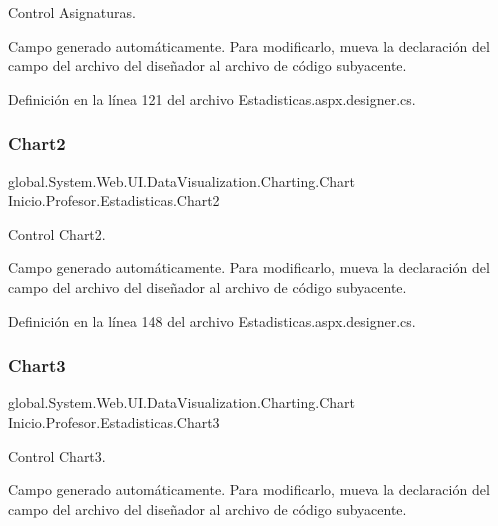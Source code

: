 Control Asignaturas. 

Campo generado automáticamente. Para modificarlo, mueva la declaración del campo del archivo del diseñador al archivo de código subyacente. 

Definición en la línea 121 del archivo Estadisticas.\+aspx.\+designer.\+cs.

\mbox{\label{classInicio_1_1Profesor_1_1Estadisticas_a78faa17a7b2d5bb5d7d92a48869af0bf}} 
\subsubsection{\texorpdfstring{Chart2}{Chart2}}
{\footnotesize\ttfamily global.\+System.\+Web.\+U\+I.\+Data\+Visualization.\+Charting.\+Chart Inicio.\+Profesor.\+Estadisticas.\+Chart2\hspace{0.3cm}{\ttfamily [protected]}}



Control Chart2. 

Campo generado automáticamente. Para modificarlo, mueva la declaración del campo del archivo del diseñador al archivo de código subyacente. 

Definición en la línea 148 del archivo Estadisticas.\+aspx.\+designer.\+cs.

\mbox{\label{classInicio_1_1Profesor_1_1Estadisticas_a05a18dc36b6140c184e2446d19e1a89b}} 
\subsubsection{\texorpdfstring{Chart3}{Chart3}}
{\footnotesize\ttfamily global.\+System.\+Web.\+U\+I.\+Data\+Visualization.\+Charting.\+Chart Inicio.\+Profesor.\+Estadisticas.\+Chart3\hspace{0.3cm}{\ttfamily [protected]}}



Control Chart3. 

Campo generado automáticamente. Para modificarlo, mueva la declaración del campo del archivo del diseñador al archivo de código subyacente. 


